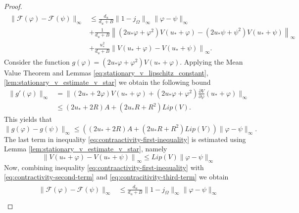 \documentclass[12pt, a4paper]{article}
\theoremstyle{break}
\theoremstyle{break}
\theoremstyle{break}
\theoremstyle{break}
\theoremstyle{break}
\theoremstyle{break}
\theoremstyle{break}
\begin{document}
\begin{proof}
    \begin{align}
        \label{eq:contraactivity-first-inequality}
        \begin{split}
            \|\mathcal{F}(\varphi) - \mathcal{F}(\psi)\|_\infty
            &\leq
            \frac{d_u}{d_u + B} \|1 - j_\Omega\|_\infty \|\varphi - \psi\|_\infty \\
            &+ \frac{1}{d_u + B} \left\|(2u_* \varphi + \varphi^2) V(u_* + \varphi)
            - (2u_* \psi + \psi^2) V(u_* + \psi) \right\|_\infty \\
            &+ \frac{u_*^2}{d_u + B}\left\| V(u_* + \varphi) - V(u_* + \psi) \right\|_\infty.
        \end{split}
    \end{align}
    Consider the function $g(\varphi) = (2u_*\varphi + \varphi^2)V(u_* + \varphi)$. Applying the Mean Value Theorem and Lemmas \ref{eq:stationary_v_lipschitz_constant}, \ref{lem:stationary_v_estimate_v_star} we obtain the following bound
    \begin{align*}
        \|g'(\varphi)\|_\infty 
        &= 
        \|(2u_* + 2 \varphi)V(u_* + \varphi) + (2u_* \varphi + \varphi^2) \frac{\partial V}{\partial \varphi}(u_* + \varphi)\|_\infty \\
        &\leq
        (2u_* + 2R) A + (2u_*R + R^2) Lip(V).
    \end{align*}
    This yields that 
    \begin{equation}
        \label{eq:contractivity-second-term}
        \|g(\varphi) - g(\psi)\|_\infty \leq \left( (2u_* + 2R) A + (2u_*R + R^2) Lip(V) \right) \|\varphi - \psi\|_\infty.
    \end{equation}
    The last term in inequality \eqref{eq:contraactivity-first-inequality} is estimated using Lemma \ref{lem:stationary_v_estimate_v_star}, namely
    \begin{equation}
        \label{eq:contracitivity-third-term}
        \left\| V(u_* + \varphi) - V(u_* + \psi) \right\|_\infty
        \leq
        Lip(V)\|\varphi - \psi\|_\infty
    \end{equation}
    Now, combining inequality \eqref{eq:contraactivity-first-inequality} with \eqref{eq:contractivity-second-term} and \eqref{eq:contracitivity-third-term} we obtain
    \begin{align}
        \label{eq:contractivity-final-inequality}
        \begin{split}
            \|\mathcal{F}(\varphi) - \mathcal{F}(\psi)\|_\infty
            &\leq
            \frac{d_u}{d_u + B} \|1 - j_\Omega\|_\infty \|\varphi - \psi\|_\infty\\

\end{split}
\end{align}
\end{proof}
\end{document}
